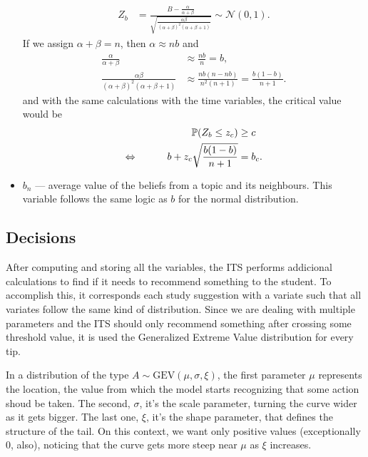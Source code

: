 \documentclass{article}
\newcommand{\0}{\mathbbold{0}}
\newcommand{\1}{\mathds{1}}
\newcommand{\LRA}{\Leftrightarrow\mkern40mu}
\newcommand{\GEV}[3]{\text{GEV}\!\left(#1,#2,#3\right)}
\begin{document}
\begin{itemize}
\begin{align*}
        Z_b &= \frac{B - \frac{\alpha}{\alpha + \beta}}{\sqrt{\frac{\alpha\beta}{(\alpha+\beta)^2(\alpha+\beta+1)}}} \sim \mathcal{N}(0,1).
    \end{align*}
    If we assign $\alpha + \beta = n$, then $\alpha \approx nb$ and
    \begin{align*}
        \frac{\alpha}{\alpha+\beta} &\approx \frac{nb}{n} = b, \\
        \frac{\alpha\beta}{(\alpha+\beta)^2(\alpha+\beta+1)} &\approx \frac{nb(n-nb)}{n^2(n+1)} = \frac{b(1-b)}{n+1}.
    \end{align*}
    and with the same calculations with the time variables, the critical value would be
    \begin{alignat*}{2}
        && \mathbb{P}(Z_b \le z_c) &\ge c \\
        \LRA && b + z_c\sqrt{\frac{b(1-b)}{n+1}} &= b_c.
    \end{alignat*}
    \item $b_n$ — average value of the beliefs from a topic and its neighbours. This variable follows the same logic as $b$ for the normal distribution.
\end{itemize}

\subsection{Decisions}
After computing and storing all the variables, the ITS performs addicional calculations to find if it needs to recommend something to the student. 
To accomplish this, it corresponds each study suggestion with a variate such that all variates follow the same kind of distribution.
Since we are dealing with multiple parameters and the ITS should only recommend something after crossing some threshold value, it is used the Generalized Extreme Value distribution for every tip.

In a distribution of the type $A \sim \GEV{\mu}{\sigma}{\xi}$, the first parameter $\mu$ represents the location, the value from which the model starts recognizing that some action shoud be taken.
The second, $\sigma$, it's the scale parameter, turning the curve wider as it gets bigger. The last one, $\xi$, it's the shape parameter, that defines the structure of the tail. On this context, we want only positive values (exceptionally 0, also), noticing that the curve gets more steep near $\mu$ as $\xi$ increases.
\end{document}
